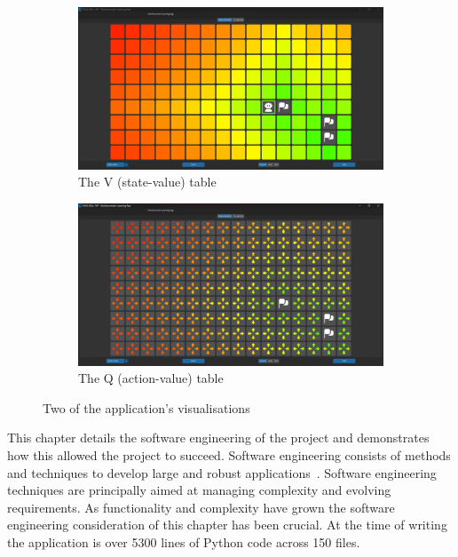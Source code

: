 \documentclass[]{final_report}
\begin{document}
\begin{figure}[H]
  \centering
  \begin{subfigure}{.5\textwidth}
    \centering
    \includegraphics[width=0.95\linewidth]{state_value}
    \caption[width=0.5\linewidth]{\label{fig:screenshot:state-value-table} The V (state-value) table}
  \end{subfigure}%
  \begin{subfigure}{.5\textwidth}
    \centering
    \includegraphics[width=0.95\linewidth]{action_value}
    \caption[width=0.5\linewidth]{\label{fig:screenshot:action-value-table} The Q (action-value) table}
  \end{subfigure}
  \caption{Two of the application's visualisations}
  \label{fig:app-ui}
\end{figure}

This chapter details the software engineering of the project and demonstrates how this allowed the project to succeed. Software engineering consists of methods and techniques to develop large and robust applications~\cite{van2008software}. Software engineering techniques are principally aimed at managing complexity and evolving requirements. As functionality and complexity have grown the software engineering consideration of this chapter has been crucial. At the time of writing the application is over 5300 lines of Python code across 150 files.
\end{document}

